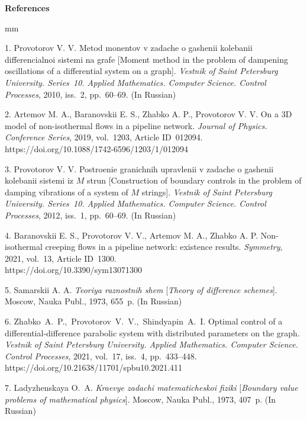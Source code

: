 

{\small



\vskip6mm

\noindent \textbf{References} }

 mm

{\footnotesize



1. Provotorov V. V.  Metod monentov v zadache o gashenii kolebanii differencialnoi sistemi na grafe [Moment method in the problem of dampening oscillations of a differential system on a graph]. \emph{Vestnik of Saint Petersburg University. Series~10. Applied Mathematics. Computer Science. Control Processes}, 2010, iss.~2, pp.~60--69.  (In Russian)

2. Artemov M. A.,  Baranovskii E. S., Zhabko A. P., Provotorov V. V.  On a 3D model of non-isothermal flows in a pipeline network. \emph{Journal of Physics. Conference Series}, 2019, vol.~1203, Article ID~012094. %
https://doi.org/10.1088/1742-6596/1203/1/012094

3. Provotorov V. V. Postroenie granichnih upravlenii v zadache o gashenii kolebanii sistemi iz $M$ strun [Construction of boundary controls in the problem of damping vibrations of a system of $M$ strings]. \emph{Vestnik of Saint Petersburg University. Series~10. Applied Mathematics. Computer Science. Control Processes}, 2012, iss.~1, pp.~60--69.  (In Russian)

4. Baranovskii E. S., Provotorov V. V., Artemov M. A., Zhabko A. P. Non-isothermal cree\-ping flows in a pipeline network: existence results. \emph{Symmetry}, 2021, vol.~13, Article ID~1300. \\
 https://doi.org/10.3390/sym13071300

5. Samarskii A. A. \emph{Teoriya raznostnih shem} [\emph{Theory of difference schemes}]. Moscow, Nauka Publ., 1973, 655~p.  (In Russian)

6. Zhabko~A.~P.,~Provotorov~V.~V.,~Shindyapin~A.~I.  Optimal control of a differential-difference parabolic system with distributed parameters on the graph. \textit{Vestnik of Saint Petersburg University. Applied Mathematics. Computer Science. Control Processes}, 2021, vol.~17, iss.~4, pp.~433--448. \\
 https://doi.org/10.21638/11701/spbu10.2021.411

7.  Ladyzhenskaya O.~A. \textit{Kraevye zadachi matematicheskoi fiziki}
[\textit{Boundary value problems of mathematical physics}]. Moscow, Nauka Publ., 1973, 407~p. (In Russian)

}
